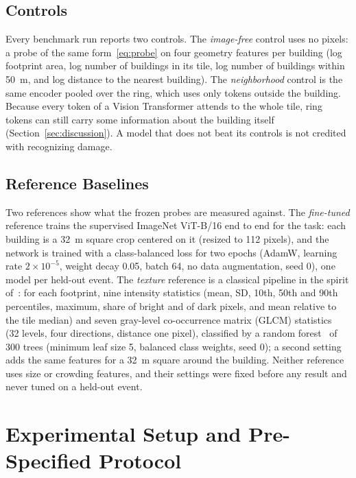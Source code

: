 \documentclass[journal]{IEEEtran}
\begin{document}
\subsection{Controls}
Every benchmark run reports two controls. The \emph{image-free} control uses no pixels: a probe of the same form~\eqref{eq:probe} on four geometry features per building (log footprint area, log number of buildings in its tile, log number of buildings within 50~m, and log distance to the nearest building). The \emph{neighborhood} control is the same encoder pooled over the ring, which uses only tokens outside the building. Because every token of a Vision Transformer attends to the whole tile, ring tokens can still carry some information about the building itself (Section~\ref{sec:discussion}). A model that does not beat its controls is not credited with recognizing damage.

\subsection{Reference Baselines}
\label{sec:baselines}
Two references show what the frozen probes are measured against. The \emph{fine-tuned} reference trains the supervised ImageNet ViT-B/16 end to end for the task: each building is a 32~m square crop centered on it (resized to 112 pixels), and the network is trained with a class-balanced loss for two epochs (AdamW, learning rate $2\times10^{-5}$, weight decay 0.05, batch 64, no data augmentation, seed 0), one model per held-out event. The \emph{texture} reference is a classical pipeline in the spirit of~\cite{macchiarulo2025sar}: for each footprint, nine intensity statistics (mean, SD, 10th, 50th and 90th percentiles, maximum, share of bright and of dark pixels, and mean relative to the tile median) and seven gray-level co-occurrence matrix (GLCM) statistics~\cite{haralick1973texture} (32 levels, four directions, distance one pixel), classified by a random forest~\cite{breiman2001rf} of 300 trees (minimum leaf size 5, balanced class weights, seed 0); a second setting adds the same features for a 32~m square around the building. Neither reference uses size or crowding features, and their settings were fixed before any result and never tuned on a held-out event.

\section{Experimental Setup and Pre-Specified Protocol}
\label{sec:setup}
\end{document}

